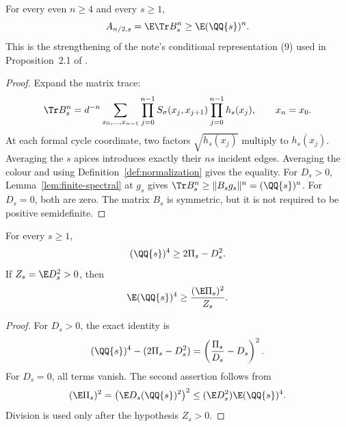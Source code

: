 \begin{proposition}
\label{prop:conditional-trace}
\proved For every even $n\ge4$ and every $s\ge1$,
\[
 A_{n/2,s}=\E\Tr B_s^n\ge\E(\QQ{s})^n.
\]
This is the strengthening of the note's conditional representation (9) used in
Proposition~2.1 of \sourceuniversal.
\end{proposition}
\begin{proof}
Expand the matrix trace:
\[
 \Tr B_s^n=d^{-n}\sum_{x_0,\ldots,x_{n-1}}
 \prod_{j=0}^{n-1}S_\sigma(x_j,x_{j+1})\prod_{j=0}^{n-1}h_s(x_j),
 \qquad x_n=x_0.
\]
At each formal cycle coordinate, two factors $\sqrt{h_s(x_j)}$ multiply to $h_s(x_j)$.
Averaging the $s$ apices introduces exactly their $ns$ incident edges.  Averaging the
colour and using Definition~\ref{def:normalization} gives the equality.
For $D_s>0$, Lemma~\ref{lem:finite-spectral} at $g_s$ gives
$\Tr B_s^n\ge\|B_sg_s\|^n=(\QQ{s})^n$.  For $D_s=0$, both are zero.
The matrix $B_s$ is symmetric, but it is not required to be positive semidefinite.
\end{proof}

\begin{lemma}
\label{lem:quartic-support}
\proved For every $s\ge1$,
\[
 (\QQ{s})^4\ge2\Pi_s-D_s^2.
\]
If $Z_s=\E D_s^2>0$, then
\[
 \E(\QQ{s})^4\ge\frac{(\E\Pi_s)^2}{Z_s}.
\]
\end{lemma}
\begin{proof}
For $D_s>0$, the exact identity is
\[
 (\QQ{s})^4-(2\Pi_s-D_s^2)=\left(\frac{\Pi_s}{D_s}-D_s\right)^2.
\]
For $D_s=0$, all terms vanish.  The second assertion follows from
\[
 (\E\Pi_s)^2=\bigl(\E D_s(\QQ{s})^2\bigr)^2
 \le (\E D_s^2)\E(\QQ{s})^4.
\]
Division is used only after the hypothesis $Z_s>0$.
\end{proof}

